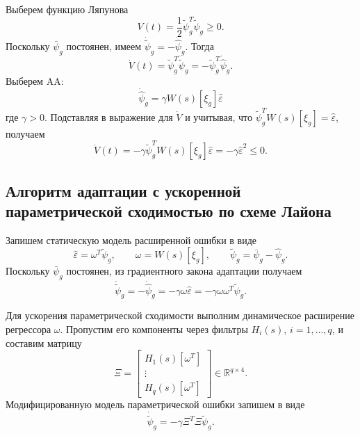 Выберем функцию Ляпунова
$$
V(t)=\frac{1}{2}\tilde{\psi}_g^T\tilde{\psi}_g\geq0.
$$
Поскольку $\bar{\psi}_g$ постоянен, имеем
$\dot{\tilde{\psi}}_g=-\dot{\hat{\psi}}_g$. Тогда
$$
\dot V(t)=\tilde{\psi}_g^T\dot{\tilde{\psi}}_g
=-\tilde{\psi}_g^T\dot{\hat{\psi}}_g.
$$
Выберем AA:
\begin{equation}
    \dot{\hat{\psi}}_g=\gamma W(s)[\xi_g]\hat{\varepsilon}
    \label{eq:qwe}
\end{equation}
где $\gamma>0$. Подставляя в выражение для $\dot V$ и учитывая,
что $\tilde{\psi}_g^T W(s)[\xi_g]=\hat{\varepsilon}$, получаем
$$
\dot V(t)
=-\gamma\tilde{\psi}_g^T W(s)[\xi_g]\hat{\varepsilon}
=-\gamma\hat{\varepsilon}^2
\leq 0.
$$

\subsection{Алгоритм адаптации с ускоренной параметрической сходимостью по схеме Лайона}
Запишем статическую модель расширенной ошибки в виде
$$
    \hat{\varepsilon}=\omega^T\tilde{\psi}_g,
    \qquad \omega=W(s)[\xi_g],
    \qquad \tilde{\psi}_g=\bar{\psi}_g-\hat{\psi}_g.
$$
Поскольку $\bar{\psi}_g$ постоянен, из градиентного закона
адаптации получаем
$$
    \dot{\tilde{\psi}}_g
    =-\dot{\hat{\psi}}_g
    =-\gamma\omega\hat{\varepsilon}
    =-\gamma\omega\omega^T\tilde{\psi}_g.
$$

Для ускорения параметрической сходимости выполним динамическое
расширение регрессора $\omega$. Пропустим его компоненты через
фильтры $H_i(s)$, $i=1,\ldots,q$, и составим матрицу
\begin{equation}
    \Xi=
    \begin{bmatrix}
        H_1(s)[\omega^T]\\
        \vdots\\
        H_q(s)[\omega^T]
    \end{bmatrix}
    \in\mathbb{R}^{q\times4}.
    \label{eq:lion_extended_regressor}
\end{equation}
Модифицированную модель параметрической ошибки запишем в виде
\begin{equation}
    \dot{\tilde{\psi}}_g=-\gamma\Xi^T\Xi\tilde{\psi}_g.
    \label{eq:lion_error_dynamics}
\end{equation}

